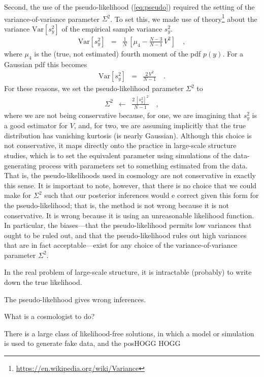 \documentclass[12pt, letterpaper, preprint]{aastex}
\newcommand{\Var}{\mathrm{Var}}
\begin{document}
Second, the use of the pseudo-likelihood (\ref{eq:pseudo}) required
the setting of the variance-of-variance parameter $\Sigma^2$.
To set this, we made use of theory\footnote{\url{https://en.wikipedia.org/wiki/Variance}}
about the variance $\Var[s^2_y]$ of
the empirical sample variance $s^2_y$.
\begin{eqnarray}
\Var[s^2_y] &=& \frac{1}{N}\,\left[\mu_4 - \frac{N-3}{N-1}\,V^2\right]
\quad ,
\end{eqnarray}
where $\mu_4$ is the (true, not estimated) fourth moment of the pdf $p(y)$.
For a Gaussian pdf this becomes
\begin{eqnarray}
\Var[s^2_y] &=& \frac{2\,V^2}{N-1}
\quad .
\end{eqnarray}
For these reasons, we set the pseudo-likelihood parameter $\Sigma^2$ to
\begin{eqnarray}
\Sigma^2 &\leftarrow& \frac{2\,[s^2_y]^2}{N-1}
\quad ,
\end{eqnarray}
where we are not being conservative because, for one, we are imagining
that $s^2_y$ is a good estimator for $V$, and, for two, we are
assuming implicitly that the true distribution has vanishing kurtosis
(is nearly Gaussian).
Although this choice is not conservative, it maps directly onto the
practice in large-scale structure studies, which is to set the
equivalent parameter using simulations of the data-generating process
with parameters set to something estimated from the data.
That is, the pseudo-likelihoods used in cosmology are not conservative
in exactly this sense.
It is important to note, however, that there is no choice that we
could make for $\Sigma^2$ such that our posterior inferences would e
correct given this form for the pseudo-likelihood; that is, the method
is not wrong because it is not conservative. It is wrong because it
is using an unreasonable likelihood function.
In particular, the biases---that the pseudo-likelihood permits low
variances that ought to be ruled out, and that the pseudo-likelihood
rules out high variances that are in fact acceptable---exist for any
choice of the variance-of-variance parameter $\Sigma^2$.

In the real problem of large-scale structure, it is intractable (probably) to 
write down the true likelihood.

The pseudo-likelihood gives wrong inferences.

What is a cosmologist to do?

There is a large class of likelihood-free solutions, in which a model or
simulation is used to generate fake data, and the posHOGG HOGG
\end{document}
